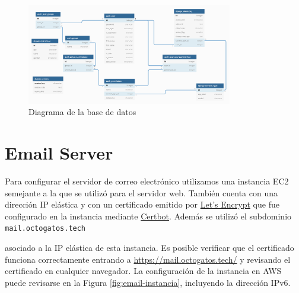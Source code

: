 \documentclass{article}
\newcommand{\ttt}[1]{%
\texttt{#1}%
}
\begin{document}
\begin{figure}[H]
  \centering
  \includegraphics[width=0.8\textwidth]{BDD/diagram}
  \caption{ Diagrama de la base de datos}
\end{figure}



\section{Email Server}

Para configurar el servidor de correo electr\'onico
utilizamos una instancia EC2 semejante a la que
se utiliz\'o para el servidor web.   Tambi\'en cuenta
con una direcci\'on IP el\'astica y con un certificado
emitido por \href{https://letsencrypt.org/}{Let's
Encrypt} que fue configurado en la instancia mediante
\href{https://certbot.eff.org/}{Certbot}.   Adem\'as
se utiliz\'o el subdominio \ttt{mail.octogatos.tech}
asociado a la IP el\'astica de esta instancia.   Es
posible verificar que el certificado funciona
correctamente entrando a
\href{https://mail.octogatos.tech/}{https://mail.octogatos.tech/}
y revisando el certificado en cualquier navegador.
La configuraci\'on de la instancia en AWS puede
revisarse en la Figura \ref{fig:email-instancia},
incluyendo la direcci\'on IPv6.
\end{document}
